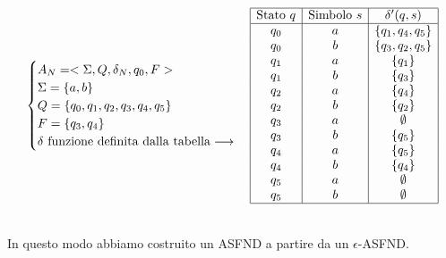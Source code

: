\begin{minipage}{0.6\textwidth}
    \[
\begin{cases}
    A_N = <\Sigma ,Q,\delta_N,q_0,F>\\
    \Sigma = \{  a,b \}\\
    Q = \{ q_0,q_1,q_2,q_3,q_4,q_5\}\\
    F = \{  q_3,q_4 \}\\
    \delta \text{  funzione definita dalla tabella} \longrightarrow
\end{cases}
\begin{array}{|c|c|c|}
\hline
\text{Stato } q & \text{Simbolo } s & \delta'(q,s) \\
\hline
q_0 & a & \{q_1, q_4, q_5\} \\
q_0 & b & \{q_3, q_2, q_5\} \\
q_1 & a & \{q_1\} \\
q_1 & b & \{q_3\} \\
q_2 & a & \{q_4\} \\
q_2 & b & \{q_2\} \\
q_3 & a & \emptyset \\
q_3 & b & \{q_5\} \\
q_4 & a & \{q_5\} \\
q_4 & b & \{q_4\} \\
q_5 & a & \emptyset \\
q_5 & b & \emptyset \\
\hline
\end{array}  \]

\end{minipage}\smallskip\\
In questo modo abbiamo costruito un ASFND a partire da un $\epsilon$-ASFND.
\newpage




